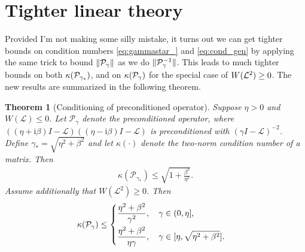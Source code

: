 \documentclass[a4paper,10pt]{article}
\newtheorem{theorem}{Theorem}
\begin{document}
%
%


\section{Tighter linear theory}
Provided I'm not making some silly mistake, it turns out we can get tighter bounds on  condition numbers \eqref{eq:gammastar_} and \eqref{eq:cond_gen} by applying the same trick to bound $\Vert {\cal P}_{\gamma} \Vert$ as we do $\Vert {\cal P}_{\gamma}^{-1} \Vert$. This leads to much tighter bounds on both $\kappa({\cal P}_{\gamma_*})$, and on $\kappa({\cal P}_{\gamma})$ for the special case of $W({\cal L}^2) \geq 0$. The new results are summarized in the following theorem.

\begin{theorem}[Conditioning of preconditioned operator]\label{th:cond_lin}
Suppose $\eta > 0$ and $W(\mathcal{L}) \leq 0$. Let $\mathcal{P}_\gamma$ denote
the preconditioned operator, where $((\eta + \mathrm{i}\beta)I -
\mathcal{L})((\eta - \mathrm{i}\beta)I - \mathcal{L})$ is
preconditioned with $(\gamma I - \mathcal{L})^{-2}$.
Define $\gamma_* = \sqrt{\eta^2+\beta^2}$ and let $\kappa(\cdot)$ denote the two-norm condition number of a matrix. Then
%
\begin{align*}
\kappa(\mathcal{P}_{\gamma_*}) \leq \sqrt{1+\frac{\beta^2}{\eta^2}}.
\end{align*}
Assume additionally that $W(\mathcal{L}^2) \geq 0$. Then 
\begin{align*}
\kappa({\cal P}_{\gamma}) \leq 
\begin{cases}
\displaystyle \frac{\eta^2 + \beta^2}{\gamma^2}, \quad \gamma \in (0, \eta], \\[2ex]
\displaystyle \frac{\eta^2 + \beta^2}{\eta \gamma}, \quad \gamma \in [\eta, \sqrt{\eta^2 + \beta^2}].
\end{cases}
\end{align*}
\end{theorem}
\end{document}
